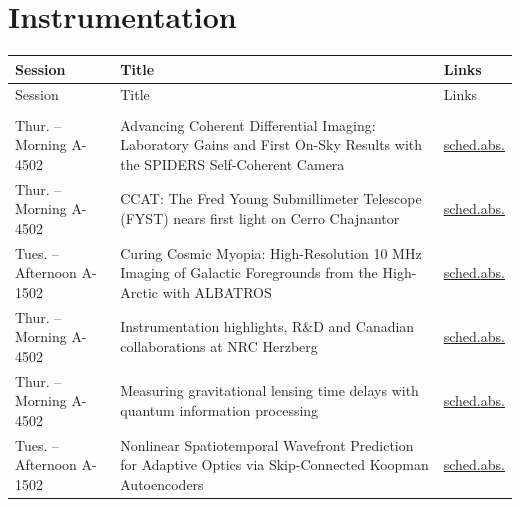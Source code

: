\section*{Instrumentation}
{\small
\setlength{\emergencystretch}{1em}
\begin{longtable}{@{}>{\TableRaggedRight\arraybackslash\hspace{0pt}}p{} >{\TableRaggedRight\arraybackslash\hspace{0pt}}p{} >{\TableRaggedRight\arraybackslash\hspace{0pt}}p{}@{}}
\toprule
Session & Title & Links \\
\midrule
\endfirsthead
\toprule
Session & Title & Links \\
\midrule
\endhead
\addlinespace[0.15em]
\multicolumn{3}{@{}l}{\sffamily\bfseries\color{cascateal} Talks} \\
\addlinespace[0.1em]
Thur. -- Morning A-4502 & Advancing Coherent Differential Imaging: Laboratory Gains and First On-Sky Results with the SPIDERS Self-Coherent Camera & \hyperlink{schedule-talk-194}{sched.}\newline \hyperlink{abstract-talk-194}{abs.} \\
Thur. -- Morning A-4502 & CCAT: The Fred Young Submillimeter Telescope (FYST) nears first light on Cerro Chajnantor & \hyperlink{schedule-talk-156}{sched.}\newline \hyperlink{abstract-talk-156}{abs.} \\
Tues. -- Afternoon A-1502 & Curing Cosmic Myopia: High-Resolution 10 MHz Imaging of Galactic Foregrounds from the High-Arctic with ALBATROS & \hyperlink{schedule-talk-200}{sched.}\newline \hyperlink{abstract-talk-200}{abs.} \\
Thur. -- Morning A-4502 & Instrumentation highlights, R\&D and Canadian collaborations at NRC Herzberg & \hyperlink{schedule-talk-151}{sched.}\newline \hyperlink{abstract-talk-151}{abs.} \\
Thur. -- Morning A-4502 & Measuring gravitational lensing time delays with quantum information processing & \hyperlink{schedule-talk-49}{sched.}\newline \hyperlink{abstract-talk-49}{abs.} \\
Tues. -- Afternoon A-1502 & Nonlinear Spatiotemporal Wavefront Prediction for Adaptive Optics via Skip-Connected Koopman Autoencoders & \hyperlink{schedule-talk-335}{sched.}\newline \hyperlink{abstract-talk-335}{abs.} \\

\end{longtable}}
